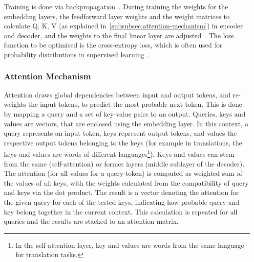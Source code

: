 Training is done via backpropagation~\autocite[e.g.][Chapter~3]{Aggarwal2018}.
During training the weights for the embedding layers, the feedforward layer weights and the weight matrices to calculate Q, K, V (as explained in~\autoref{subsubsec:attention-mechanism}) in encoder and decoder, and the weights to the final linear layer are adjusted~\autocite{Vaswani2017}.
The loss function to be optimised is the cross-entropy loss, which is often used for probability distributions in supervised learning~\autocite[Chapter~1.2.2]{Aggarwal2018}.

\subsubsection{Attention Mechanism}\label{subsubsec:attention-mechanism}
Attention draws global dependencies between input and output tokens, and re-weights the input tokens, to predict the most probable next token. %
This is done by mapping a query and a set of key-value pairs to an output.
Queries, keys and values are vectors, that are enclosed using the embedding layer.
In this context, a query represents an input token, keys represent output tokens, and values the respective output tokens belonging to the keys (for example in translations, the keys and values are words of different languages\footnote{In the self-attention layer, key and values are words from the same language for translation tasks.}). %
Keys and values can stem from the same (self-attention) or former layers (middle sublayer of the decoder).
The attention (for all values for a query-token) is computed as weighted sum of the values of all keys, with the weights calculated from the compatibility of query and keys via the dot product.
The result is a vector denoting the attention for the given query for each of the tested keys, indicating how probable query and key belong together in the current context. %
This calculation is repeated for all queries and the results are stacked to an attention matrix.~\autocite{Vaswani2017}

